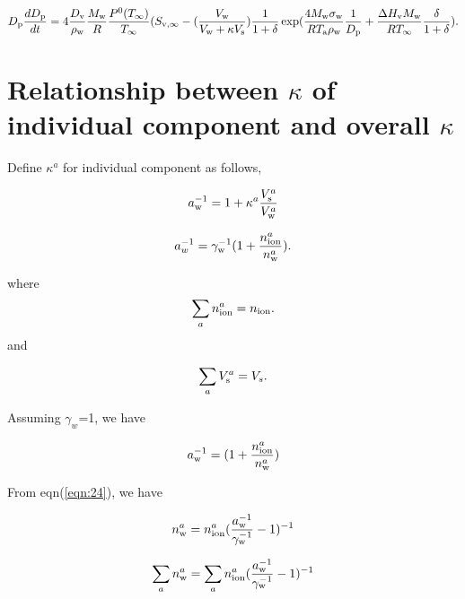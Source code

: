 \documentclass[12pt]{article}
\begin{document}
\begin{equation}\label{eqn:22}
D_{\rm p}\frac{dD_{\rm p}}{dt}=4 \frac{D_{\rm v}} {\rho_{\rm w}} \frac{M_{\rm w}}{R} \frac{P^{\rm 0}(T_{\infty})} {T_{\infty}} (S_{\rm v, \infty} -  (\frac{V_{\rm w}}{V_{\rm w} + \kappa V_{\rm s}}) \frac{1}{1+\delta} \exp(\frac{4 M_{\rm w}\sigma_{\rm w}}{R T_{\rm a} \rho_{\rm w}}\frac{1}{D_{\rm p}}+\frac{\Delta H_{\rm v} M_{\rm w}}{R T_{\infty}} \frac{\delta}{1+\delta}).
\end{equation}


\section{Relationship between $\kappa$ of individual component and overall $\kappa$}

Define $\kappa^{a}$ for individual component as follows, 

\begin{equation}\label{eqn:23}
a_{\rm w}^{-1}=1+\kappa^{a} \frac{V_{\rm s}^{a}}{V_{\rm w}^{a}} 
\end{equation}

\begin{equation}\label{eqn:24}
a_{w}^{-1}=\gamma_{\rm w}^{-1} (1+\frac{n_{\rm ion}^{a}}{n_{\rm w}^{a}}).
\end{equation}

where
\begin{equation}\label{eqn:25}
\sum_{a} n_{\rm ion}^{a}=n_{\rm ion}.
\end{equation}
 and 
 
\begin{equation}\label{eqn:25}
\sum_{a} V_{\rm s}^{a}=V_{s}.
\end{equation}

 
Assuming $\gamma_{w}$=1, we have 

\begin{equation}\label{eqn:26}
a_{\rm w}^{-1}=(1+\frac{n_{\rm ion}^{a}}{n_{\rm w}^{a}})
\end{equation}

From eqn(\ref{eqn:24}), we have

\begin{equation}\label{eqn:27}
n_{\rm w}^{a}=n_{\rm ion}^{a}(\frac{a_{\rm w}^{-1}}{\gamma_{\rm w}^{-1}}-1)^{-1}
\end{equation}

\begin{equation}
\sum_{a} n_{\rm w}^{a}=\sum_{a}n_{\rm ion}^{a}(\frac{a_{\rm w}^{-1}}{\gamma_{\rm w}^{-1}}-1)^{-1}
\end{equation}
\end{document}
